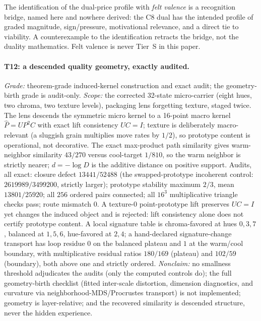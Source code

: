 \begin{remark}
\gradeR{} The identification of the dual-price profile with \emph{felt
valence} is a recognition bridge, named here and nowhere derived: the C8 dual
has the intended profile of graded magnitude, sign/pressure, motivational
relevance, and a direct tie to viability. A counterexample to the identification
retracts the bridge, not the duality mathematics. Felt valence is never
Tier~S in this paper.
\end{remark}

\paragraph{T12: a descended quality geometry, exactly audited.}
\begin{theorem}
\gradeS{} \emph{Grade:} theorem-grade induced-kernel construction and exact
audit; the geometry-birth grade is audit-only. \emph{Scope:} the corrected
32-state micro-carrier (eight hues, two chroma, two texture levels), packaging
lens forgetting texture, staged twice. The lens descends the symmetric micro
kernel to a 16-point macro kernel $\hat P = U P^2 C$ with exact lift
consistency $UC = I$; texture is deliberately macro-relevant (a sluggish
grain multiplies move rates by $1/2$), so prototype content is operational,
not decorative. The exact max-product path similarity gives warm-neighbor
similarity $43/270$ versus cool-target $1/810$, so the warm neighbor is
strictly nearer; $d = -\log D$ is the additive distance on positive support.
Audits, all exact: closure defect $13441/52488$ (the swapped-prototype
incoherent control: $2619989/3499200$, strictly larger); prototype stability
maximum $2/3$, mean $13801/25920$; all $256$ ordered pairs connected; all
$16^3$ multiplicative triangle checks pass; route mismatch $0$. A texture-0
point-prototype lift preserves $UC=I$ yet changes the induced object and is
rejected: lift consistency alone does not certify prototype content. A local
signature table is chroma-favored at hues $0,3,7$, balanced at $1,5,6$,
hue-favored at $2,4$; a hand-declared signature-change transport has loop
residue $0$ on the balanced plateau and $1$ at the warm/cool boundary, with
multiplicative residual ratios $180/169$ (plateau) and $102/59$ (boundary),
both above one and strictly ordered. \emph{Nonclaim:} no smallness threshold
adjudicates the audits (only the computed controls do); the full
geometry-birth checklist (fitted inter-scale distortion, dimension
diagnostics, and curvature via neighborhood-MDS/Procrustes transport) is
not implemented; geometry is layer-relative; and the recovered similarity is
descended structure, never the hidden experience.
\end{theorem}

